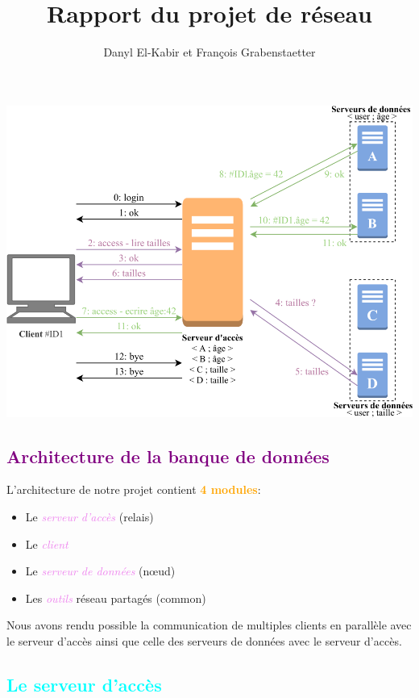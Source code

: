 \documentclass[a4paper]{article}
\title{Rapport du projet de réseau}
\author{Danyl El-Kabir et François Grabenstaetter}
\let\oldsection\section{}
\renewcommand{\section}[1]{\textcolor{purple}{\oldsection{#1}}}
\let\oldsubsection\subsection{}
\renewcommand{\subsection}[1]{\textcolor{cyan}{\oldsubsection{#1}}}
\let\oldtextbf\textbf
\renewcommand{\textbf}[1]{\textcolor{orange}{\oldtextbf{#1}}}
\let\oldtextit\textit
\renewcommand{\textit}[1]{\textcolor{violet}{\oldtextit{#1}}}
\begin{document}
\sffamily
\everymath{\displaystyle}
\setlength\parindent{0mm}
\setlength{\parskip}{0.2cm}
\maketitle

\begin{center}
    \includegraphics[scale=1.6]{img/enonce.png}
\end{center}

\section{Architecture de la banque de données}

L'architecture de notre projet contient \textbf{4 modules}:
\begin{itemize}
    \item Le \textit{serveur d'accès} (relais)
    \item Le \textit{client}
    \item Le \textit{serveur de données} (nœud)
    \item Les \textit{outils} réseau partagés (common)
\end{itemize}

Nous avons rendu possible la communication de multiples clients en parallèle avec le serveur d'accès ainsi que celle des serveurs de données avec le serveur d'accès.

\subsection{Le serveur d'accès}
\end{document}

